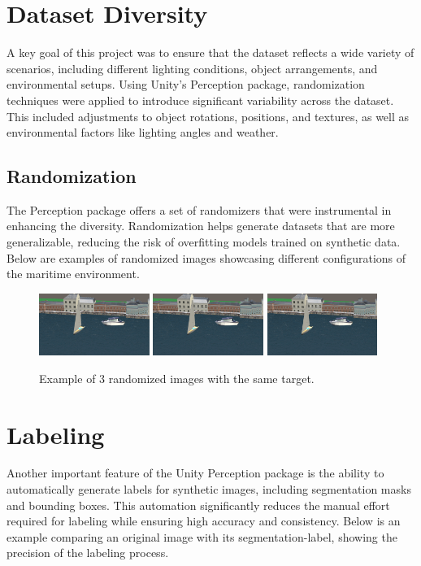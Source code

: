 \section{Dataset Diversity}
A key goal of this project was to ensure that the dataset reflects a wide variety of scenarios, including different lighting conditions, object arrangements, and environmental setups. Using Unity's Perception package, randomization techniques were applied to introduce significant variability across the dataset. This included adjustments to object rotations, positions, and textures, as well as environmental factors like lighting angles and weather.

\subsection{Randomization}
The Perception package offers a set of randomizers that were instrumental in enhancing the diversity. Randomization helps generate datasets that are more generalizable, reducing the risk of overfitting models trained on synthetic data. Below are examples of randomized images showcasing different configurations of the maritime environment.

\begin{figure}[H]
\centering
\includegraphics[width=0.32\textwidth]{Figures/rgb_2.png}
\includegraphics[width=0.32\textwidth]{Figures/rgb_2.png}
\includegraphics[width=0.32\textwidth]{Figures/rgb_2.png}
\caption{Example of 3 randomized images with the same target.}
\label{fig:randomized_images}
\end{figure}

\section{Labeling}
Another important feature of the Unity Perception package is the ability to automatically generate labels for synthetic images, including segmentation masks and bounding boxes. This automation significantly reduces the manual effort required for labeling while ensuring high accuracy and consistency. Below is an example comparing an original image with its segmentation-label, showing the precision of the labeling process.

